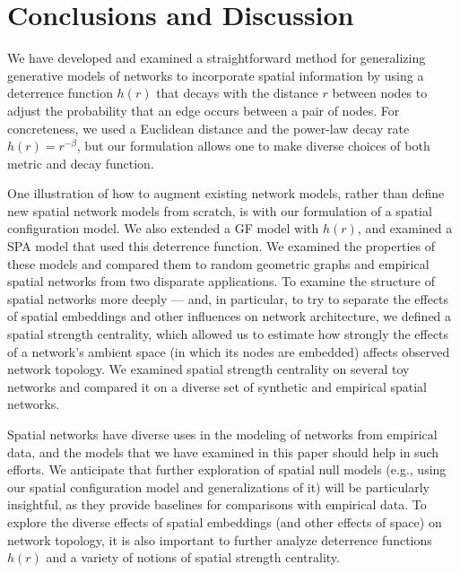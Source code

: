 \documentclass[%
 reprint,
 amsmath,amssymb,
 aps,
]{revtex4-1}
\begin{document}


\section{Conclusions and Discussion} \label{sec:discussion}

We have developed and examined a straightforward method for generalizing generative models of networks to incorporate spatial information by using a deterrence function $h(r)$ that decays with the distance $r$ between nodes to adjust the probability that an edge occurs between a pair of nodes. For concreteness, we used a Euclidean distance and the power-law decay rate $h(r) = r^{-\beta}$, but our formulation allows one to make diverse choices of both metric and decay function. 


One illustration of how to augment existing network models, rather than define new spatial network models from scratch, is with our formulation of a spatial configuration model. We also extended a GF model with $h(r)$, and examined a SPA model that used this deterrence function. 
We examined the properties of these models and compared them to random geometric graphs and empirical spatial networks from two disparate applications. To examine the structure of spatial networks more deeply --- and, in particular, to try to separate the effects of spatial embeddings and other influences on network architecture, we defined a spatial strength centrality, which allowed us to estimate how strongly the effects of a network's ambient space (in which its nodes are embedded) affects observed network topology. We examined spatial strength centrality on several toy networks and 
compared it on a diverse set of synthetic and empirical spatial networks.

Spatial networks have diverse uses in the modeling of networks from empirical data, and the models that we have examined in this paper should help in such efforts. We anticipate that further exploration of spatial null models (e.g., using our spatial configuration model and generalizations of it) will be particularly insightful, as they provide baselines for comparisons with empirical data. To explore the diverse effects of spatial embeddings (and other effects of space) on network topology, it is also important to further analyze deterrence functions $h(r)$ and a variety of notions of spatial strength centrality.
\end{document}
